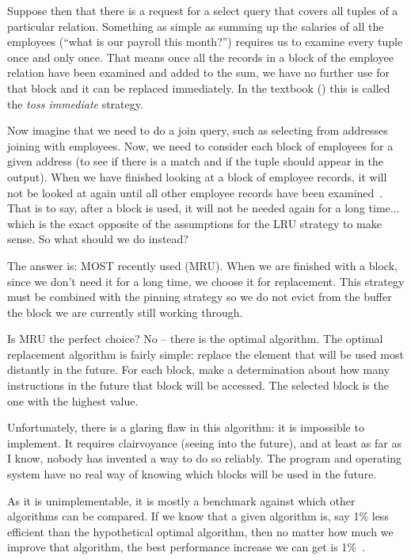 Suppose then that there is a request for a select query that covers all tuples of a particular relation. Something as simple as summing up the salaries of all the employees (``what is our payroll this month?'') requires us to examine every tuple once and only once. That means once all the records in a block of the employee relation have been examined and added to the sum, we have no further use for that block and it can be replaced immediately. In the textbook (\cite{dsc}) this is called the \textit{toss immediate} strategy.

Now imagine that we need to do a join query, such as selecting from addresses joining with employees. Now, we need to consider each block of employees for a given address (to see if there is a match and if the tuple should appear in the output). When we have finished looking at a block of employee records, it will not be looked at again until all other employee records have been examined~\cite{dsc}. That is to say, after a block is used, it will not be needed again for a long time... which is the exact opposite of the assumptions for the LRU strategy to make sense. So what should we do instead?

The answer is: MOST recently used (MRU). When we are finished with a block, since we don't need it for a long time, we choose it for replacement. This strategy must be combined with the pinning strategy so we do not evict from the buffer the block we are currently still working through.

Is MRU the perfect choice? No -- there is the optimal algorithm. The optimal replacement algorithm is fairly simple: replace the element that will be used most distantly in the future. For each block, make a determination about how many instructions in the future that block will be accessed. The selected block is the one with the highest value.

Unfortunately, there is a glaring flaw in this algorithm: it is impossible to implement. It requires clairvoyance (seeing into the future), and at least as far as I know, nobody has invented a way to do so reliably. The program and operating system have no real way of knowing which blocks will be used in the future.

As it is unimplementable, it is mostly a benchmark against which other algorithms can be compared. If we know that a given algorithm is, say 1\% less efficient than the hypothetical optimal algorithm, then no matter how much we improve that algorithm, the best performance increase we can get is 1\%~\cite{mos}.


